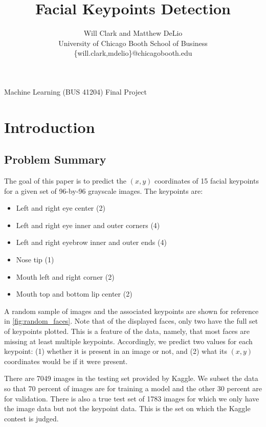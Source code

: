\documentclass[journal]{IEEEtran}
\begin{document}
\title{Facial Keypoints Detection}
\author{Will Clark and Matthew DeLio\\
University of Chicago Booth School of Business\\
\textsf{\{will.clark,mdelio\}@chicagobooth.edu}}

{Machine Learning (BUS 41204) Final Project}

\maketitle

\section{Introduction}

\subsection{Problem Summary}

The goal of this paper is to predict the $(x,y)$ coordinates of 15 facial keypoints for a given set of 96-by-96 grayscale images. The keypoints are:
\begin{itemize}
\item Left and right eye center (2)
\item Left and right eye inner and outer corners (4)
\item Left and right eyebrow inner and outer ends (4)
\item Nose tip (1)
\item Mouth left and right corner (2)
\item Mouth top and bottom lip center (2)
\end{itemize}
A random sample of images and the associated keypoints are shown for reference in \cref{fig:random_faces}. Note that of the displayed faces, only two have the full set of keypoints plotted. This is a feature of the data, namely, that most faces are missing at least multiple keypoints. Accordingly, we predict two values for each keypoint: (1) whether it is present in an image or not, and (2) what its $(x,y)$ coordinates would be if it were present.

There are 7049 images in the testing set provided by Kaggle. We subset the data so that 70 percent of images are for training a model and the other 30 percent are for validation. There is also a true test set of 1783 images for which we only have the image data but not the keypoint data. This is the set on which the Kaggle contest is judged.
\end{document}
